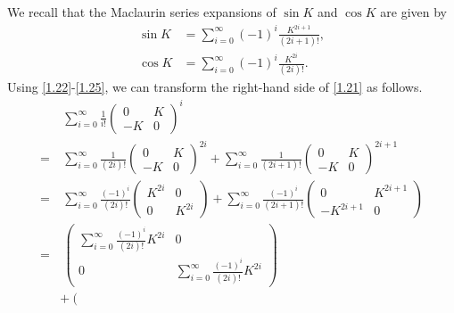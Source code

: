 \documentclass[a4paper]{article}
\numberwithin{equation}{section}
\begin{document}
We recall that the Maclaurin series expansions of $\sin K$ and $\cos K$ are given by
\begin{align}
\sin K &= \sum\limits_{i = 0}^\infty  {{{\left( { - 1} \right)}^i}\frac{{{K^{2i + 1}}}}{{\left( {2i + 1} \right)!}}} ,\\
\cos K &= \sum\limits_{i = 0}^\infty  {{{\left( { - 1} \right)}^i}\frac{{{K^{2i}}}}{{\left( {2i} \right)!}}}.\label{1.25}
\end{align}
Using \eqref{1.22}-\eqref{1.25}, we can transform the right-hand side of \eqref{1.21} as follows.
\begin{align}
&\ \sum\limits_{i = 0}^\infty  {\frac{1}{{i!}}{{\left( {\begin{array}{*{20}{c}}
0&K\\
{ - K}&0
\end{array}} \right)}^i}}  \\
=&\ \sum\limits_{i = 0}^\infty  {\frac{1}{{\left( {2i} \right)!}}{{\left( {\begin{array}{*{20}{c}}
0&K\\
{ - K}&0
\end{array}} \right)}^{2i}}}  + \sum\limits_{i = 0}^\infty  {\frac{1}{{\left( {2i + 1} \right)!}}{{\left( {\begin{array}{*{20}{c}}
0&K\\
{ - K}&0
\end{array}} \right)}^{2i + 1}}} \\
 =&\ \sum\limits_{i = 0}^\infty  {\frac{{{{\left( { - 1} \right)}^i}}}{{\left( {2i} \right)!}}\left( {\begin{array}{*{20}{c}}
{{K^{2i}}}&0\\
0&{{K^{2i}}}
\end{array}} \right)}  + \sum\limits_{i = 0}^\infty  {\frac{{{{\left( { - 1} \right)}^i}}}{{\left( {2i + 1} \right)!}}\left( {\begin{array}{*{20}{c}}
0&{{K^{2i + 1}}}\\
{ - {K^{2i + 1}}}&0
\end{array}} \right)} \\
 =&\ \left( {\begin{array}{*{20}{c}}
{\sum\limits_{i = 0}^\infty  {\frac{{{{\left( { - 1} \right)}^i}}}{{\left( {2i} \right)!}}{K^{2i}}} }&0\\
0&{\sum\limits_{i = 0}^\infty  {\frac{{{{\left( { - 1} \right)}^i}}}{{\left( {2i} \right)!}}{K^{2i}}} }
\end{array}} \right) \\
&+ \left( {\begin{array}{*{20}{c}}

\end{array}}
\end{align}
\end{document}
